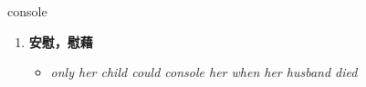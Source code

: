 
\begin{frame}
{\huge console}
\begin{center}
\begin{enumerate}\Large
  \item \textbf{安慰，慰藉}
  \begin{itemize}
    \item \em{\Large{only her child could console her when her husband died}}
  \end{itemize}
\end{enumerate}
\end{center}
\end{frame}
